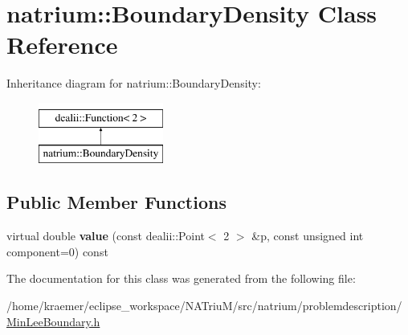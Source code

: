 \hypertarget{classnatrium_1_1BoundaryDensity}{\section{natrium\-:\-:Boundary\-Density Class Reference}
\label{classnatrium_1_1BoundaryDensity}
}
Inheritance diagram for natrium\-:\-:Boundary\-Density\-:\begin{figure}[H]
\begin{center}
\leavevmode
\includegraphics[height=2.000000cm]{classnatrium_1_1BoundaryDensity}
\end{center}
\end{figure}
\subsection*{Public Member Functions}
\begin{DoxyCompactItemize}
\item 
\hypertarget{classnatrium_1_1BoundaryDensity_aea4a63e9b0ef8a965b61d3a9bfcd076e}{virtual double {\bfseries value} (const dealii\-::\-Point$<$ 2 $>$ \&p, const unsigned int component=0) const }\label{classnatrium_1_1BoundaryDensity_aea4a63e9b0ef8a965b61d3a9bfcd076e}

\end{DoxyCompactItemize}


The documentation for this class was generated from the following file\-:\begin{DoxyCompactItemize}
\item 
/home/kraemer/eclipse\-\_\-workspace/\-N\-A\-Triu\-M/src/natrium/problemdescription/\hyperlink{MinLeeBoundary_8h}{Min\-Lee\-Boundary.\-h}\end{DoxyCompactItemize}
